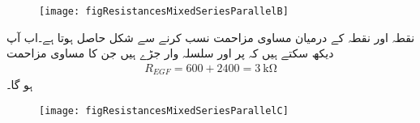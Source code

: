 \begin{figure}
\centering
\texttt{[image: figResistancesMixedSeriesParallelB]}
\caption{}
\label{مشق_مزاحمتی_سلسلہ_وار_متوازی_مزاحمت_الف}
\end{figure}

نقطہ  اور نقطہ  کے درمیان مساوی مزاحمت نسب کرنے سے شکل  حاصل ہوتا ہے۔اب آپ دیکھ سکتے ہیں کہ  پر  اور  سلسلہ وار جڑے ہیں جن کا مساوی مزاحمت
\begin{align*}
R_{EGF}=600+2400=\SI{3}{\kilo\ohm}
\end{align*}
ہو گا۔
\begin{figure}
\centering
\texttt{[image: figResistancesMixedSeriesParallelC]}
\caption{}
\label{مشق_مزاحمتی_سلسلہ_وار_متوازی_مزاحمت_ب}
\end{figure}

